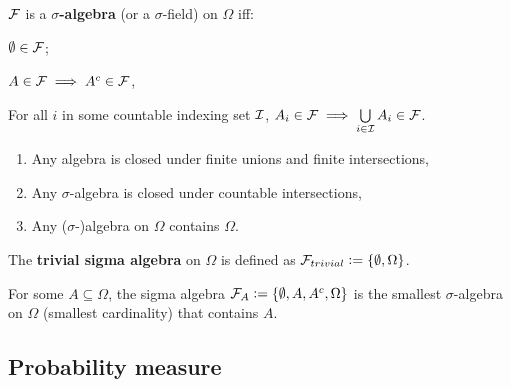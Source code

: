 \documentclass[../Year1/Year1.tex]{subfiles}
\begin{document}
\begin{definition}
    $\mathcal{F}$ is a \textbf{$\sigma$-algebra} (or a $\sigma$-field) on $\Omega$ iff:\\
    \begin{enumerate*}
        \item $\emptyset \in \mathcal{F}$; \hspace{15pt}
        \item $A \in \mathcal{F} \implies A^c \in \mathcal{F}$, \hspace{15pt}
        \item For all $i$ in some countable indexing set $\mathcal{I}$, $A_i \in \mathcal{F} \implies \bigcup\limits_{i\in \mathcal{I}}A_i \in \mathcal{F}$.
    \end{enumerate*}
\end{definition}

\begin{remark}
    \begin{enumerate}
        \item Any algebra is closed under finite unions and finite intersections,
        \item Any $\sigma$-algebra is closed under countable intersections,
        \item Any ($\sigma$-)algebra on $\Omega$ contains $\Omega$.
    \end{enumerate}
\end{remark}

\begin{definition}
    The \textbf{trivial sigma algebra} on $\Omega$ is defined as $\mathcal{F}_{trivial} := \{ \emptyset, \Omega \}$.
\end{definition}

\begin{example}
    For some $A \subseteq \Omega$, the sigma algebra $\mathcal{F}_A := \{\emptyset, A, A^c , \Omega \}$ is the smallest $\sigma$-algebra on $\Omega$ (smallest cardinality) that contains $A$.
\end{example}


\subsection{Probability measure}
\end{document}

